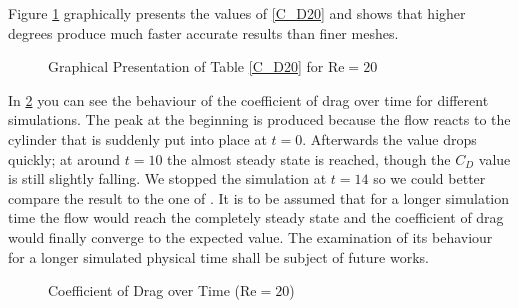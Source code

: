Figure \ref{fig:C_D20} graphically presents the values of \cref{C_D20} and shows that higher degrees produce much faster accurate results than finer meshes. \\\indent
	\begin{figure}[htp]	
		\centering
		\caption{Graphical Presentation of Table \ref{C_D20} for $\text{Re} = 20$}
		\label{fig:C_D20}	
	\end{figure}
	In \cref{fig:C_Dt} you can see the behaviour of the coefficient of drag over time for different simulations. The peak at the beginning is produced because the flow reacts to the cylinder that is suddenly put into place at $t=0$. Afterwards the value drops quickly; at around $t=10$ the almost steady state is reached, though the $C_D$ value is still slightly falling. We stopped the simulation at $t=14$ so we could better compare the result to the one of \textcite{ayers}. It is to be assumed that for a longer simulation time the flow would reach the completely steady state and the coefficient of drag would finally converge to the expected value. The examination of its behaviour for a longer simulated physical time shall be subject of future works.\\\indent
\begin{figure}[htp]	
	\centering
	\caption{Coefficient of Drag over Time ($\text{Re} = 20$)}
	\label{fig:C_Dt}	
\end{figure}
